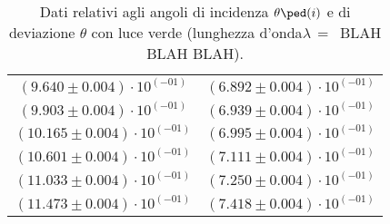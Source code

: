 \begin{table}[H]
\begin{tabular}{c c}
	$(9.640 \pm 0.004) \cdot 10^(-01)$ &	$(6.892 \pm 0.004) \cdot 10^(-01)$ \\	%
	$(9.903 \pm 0.004) \cdot 10^(-01)$ &	$(6.939 \pm 0.004) \cdot 10^(-01)$ \\	%
	$(10.165 \pm 0.004) \cdot 10^(-01)$ &	$(6.995 \pm 0.004) \cdot 10^(-01)$ \\	%
	$(10.601 \pm 0.004) \cdot 10^(-01)$ &	$(7.111 \pm 0.004) \cdot 10^(-01)$ \\	%
	$(11.033 \pm 0.004) \cdot 10^(-01)$ &	$(7.250 \pm 0.004) \cdot 10^(-01)$ \\	%
	$(11.473 \pm 0.004) \cdot 10^(-01)$ &	$(7.418 \pm 0.004) \cdot 10^(-01)$ \\	%
        \bottomrule
    \end{tabular}
    \caption{Dati relativi agli angoli di incidenza $\theta\ped(i)$ e di deviazione $\theta$ con luce verde (lunghezza d'onda$\lambda\,=\,$ BLAH BLAH BLAH).}
    \label{tab:dev}
\end{table}
